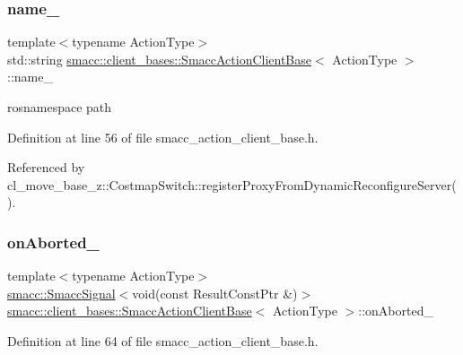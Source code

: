 \subsubsection{\texorpdfstring{name\+\_\+}{name\_}}
{\footnotesize\ttfamily template$<$typename Action\+Type$>$ \\
std\+::string \hyperlink{classsmacc_1_1client__bases_1_1SmaccActionClientBase}{smacc\+::client\+\_\+bases\+::\+Smacc\+Action\+Client\+Base}$<$ Action\+Type $>$\+::name\+\_\+}



rosnamespace path 



Definition at line 56 of file smacc\+\_\+action\+\_\+client\+\_\+base.\+h.



Referenced by cl\+\_\+move\+\_\+base\+\_\+z\+::\+Costmap\+Switch\+::register\+Proxy\+From\+Dynamic\+Reconfigure\+Server().

\mbox{\label{classsmacc_1_1client__bases_1_1SmaccActionClientBase_adc33748ca4fcef9730f8039b75d496d0}} 
\subsubsection{\texorpdfstring{on\+Aborted\+\_\+}{onAborted\_}}
{\footnotesize\ttfamily template$<$typename Action\+Type$>$ \\
\hyperlink{classsmacc_1_1SmaccSignal}{smacc\+::\+Smacc\+Signal}$<$void(const Result\+Const\+Ptr \&)$>$ \hyperlink{classsmacc_1_1client__bases_1_1SmaccActionClientBase}{smacc\+::client\+\_\+bases\+::\+Smacc\+Action\+Client\+Base}$<$ Action\+Type $>$\+::on\+Aborted\+\_\+}



Definition at line 64 of file smacc\+\_\+action\+\_\+client\+\_\+base.\+h.

\mbox{\label{classsmacc_1_1client__bases_1_1SmaccActionClientBase_a23846f928b48b5da809690883044b14b}} 
